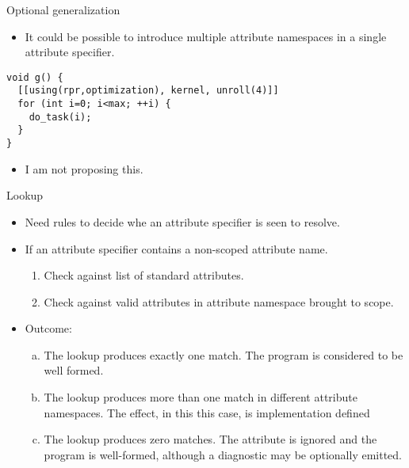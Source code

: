 \begin{frame}[t,fragile]{Optional generalization}
\begin{itemize}
  \item It could be possible to introduce multiple attribute
        namespaces in a single attribute specifier.
\end{itemize}
\vfill
\begin{lstlisting}
void g() {
  [[using(rpr,optimization), kernel, unroll(4)]]
  for (int i=0; i<max; ++i) {
    do_task(i);
  }
}
\end{lstlisting}
\vfill
\begin{itemize}
  \item I am not proposing this.
\end{itemize}
\end{frame}

\begin{frame}[t,shrink]{Lookup}
\begin{itemize}
  \item Need rules to decide whe an attribute specifier is seen to resolve.
\end{itemize}
\vfill
\begin{itemize}
  \item If an attribute specifier contains a non-scoped attribute name.
    \begin{enumerate}[1]
      \item Check against list of standard attributes.
      \item Check against valid attributes in attribute namespace brought to scope.
    \end{enumerate}
  \item Outcome:
    \begin{enumerate}[a)]
      \item The lookup produces exactly one match. The program is considered
      to be well formed.
      
      \item The lookup produces more than one match in different attribute namespaces.
      The effect, in this this case, is implementation defined
      
      \item The lookup produces zero matches. The attribute is ignored and the
      program is well-formed, although a diagnostic may be optionally emitted.
    \end{enumerate}
\end{itemize}
\end{frame}

